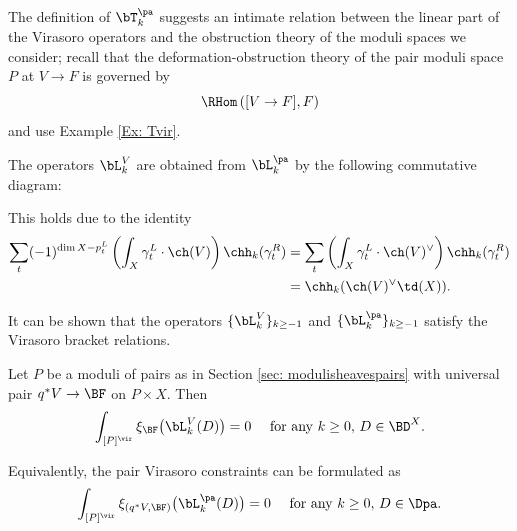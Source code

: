The definition of $\bT_k^{\pa}$ suggests an intimate relation between the linear part of the Virasoro operators and the obstruction theory of the moduli spaces we consider; recall that the deformation-obstruction theory of the pair moduli space $P$ at $V\to F$ is governed by
\[\RHom\left([V\to F], F\right)\]
and use Example \ref{Ex: Tvir}.

The operators $\bL_k^V$ are obtained from $\bL_k^{\pa}$ by the following commutative diagram:


This holds due to the identity
\begin{align*}
\sum_{t}(-1)^{\dim X-p_t^L}\left(\int_X \gamma_t^L \cdot \ch(V) \right)\chh_k(\gamma_t^R)&=\sum_t \left(\int_X \gamma_t^L \cdot \ch(V)^\vee \right)\chh_k(\gamma_t^R)\\
&=\chh_k(\ch(V)^\vee \td(X)).
\end{align*}



It can be shown that the operators $\{\bL_k^V\}_{k\geq -1}$ and $\{\bL_k^{\pa}\}_{k\geq -1}$ satisfy the Virasoro bracket relations.

\begin{conjecture}
\notready\label{conj: pairvirasoro}
Let $P$ be a moduli of pairs as in Section \ref{sec: modulisheavespairs} with universal pair $q^\ast V\to \BF$ on $P\times X$. Then
\[\int_{[P]^\vir}\xi_\BF\big(\bL_k^V(D)\big)=0\quad \textup{ for any }k\geq 0, \, D\in \BD^X.\]
\end{conjecture}
Equivalently, the pair Virasoro constraints can be formulated as
\[\int_{[P]^\vir} \xi_{(q^\ast V,\BF)}\big(\bL_k^{\pa}(D)\big)=0\quad \textup{ for any }k\geq 0, \, D\in \Dpa.\]

